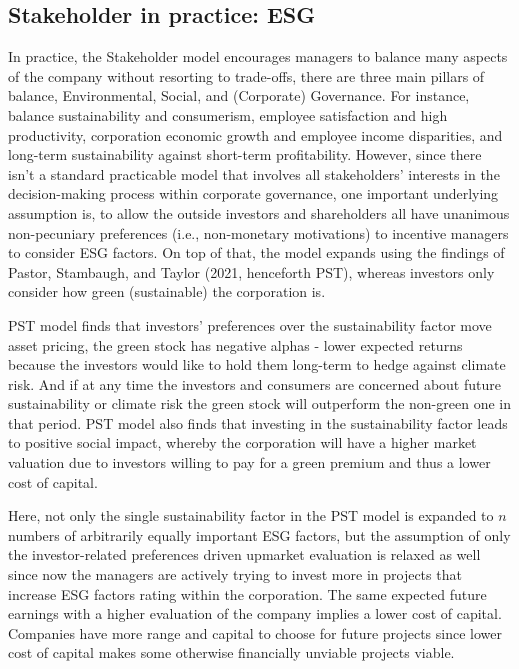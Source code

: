 \documentclass[a4paper, 12pt]{article}
\begin{document}
\vspace{-10pt}
\subsection{Stakeholder in practice: ESG}
\vspace{-10pt}
  \hspace{12pt} In practice, the Stakeholder model encourages managers to balance many aspects of the company without resorting to trade-offs, there are three main pillars of balance, Environmental, Social, and (Corporate) Governance. For instance, balance sustainability and consumerism, employee satisfaction and high productivity, corporation economic growth and employee income disparities, and long-term sustainability against short-term profitability. However, since there isn't a standard practicable model that involves all stakeholders' interests in the decision-making process within corporate governance, one important underlying assumption is, to allow the outside investors and shareholders all have unanimous non-pecuniary preferences (i.e., non-monetary motivations) to incentive managers to consider ESG factors. On top of that, the model expands using the findings of Pastor, Stambaugh, and Taylor (2021, henceforth PST)\cite{Pastor}, whereas investors only consider how green (sustainable) the corporation is. 

  PST model finds that investors' preferences over the sustainability factor move asset pricing, the green stock has negative alphas - lower expected returns because the investors would like to hold them long-term to hedge against climate risk. And if at any time the investors and consumers are concerned about future sustainability or climate risk the green stock will outperform the non-green one in that period. PST model also finds that investing in the sustainability factor leads to positive social impact, whereby the corporation will have a higher market valuation due to investors willing to pay for a green premium and thus a lower cost of capital. 

  Here, not only the single sustainability factor in the PST model is expanded to $n$ numbers of arbitrarily equally important ESG factors, but the assumption of only the investor-related preferences driven upmarket evaluation is relaxed as well since now the managers are actively trying to invest more in projects that increase ESG factors rating within the corporation. The same expected future earnings with a higher evaluation of the company implies a lower cost of capital. Companies have more range and capital to choose for future projects since lower cost of capital makes some otherwise financially unviable projects viable. 
\end{document}
